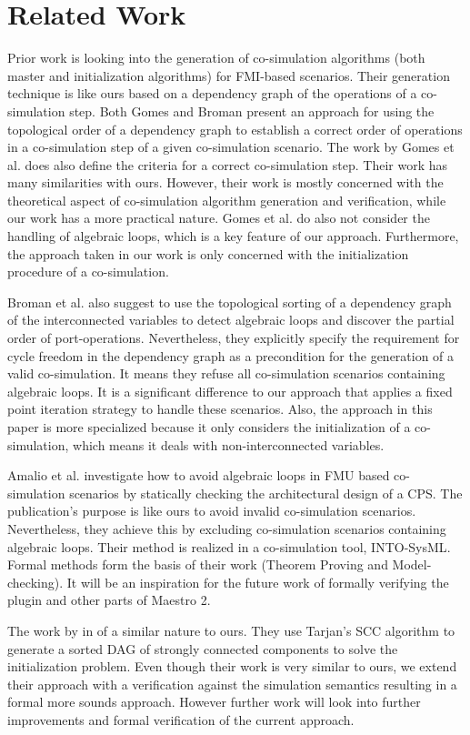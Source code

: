 \section{Related Work}
Prior work \cite{Gomes2019, BromanCompositionCo-Simulation} is looking into the generation of co-simulation algorithms (both master and initialization algorithms) for FMI-based scenarios. Their generation technique is like ours based on a dependency graph of the operations of a co-simulation step. Both Gomes and Broman present an approach for using the topological order of a dependency graph to establish a correct order of operations in a co-simulation step of a given co-simulation scenario.
The work by Gomes et al. \cite{Gomes2019} does also define the criteria for a correct co-simulation step. Their work has many similarities with ours. However, their work is mostly concerned with the theoretical aspect of co-simulation algorithm generation and verification, while our work has a more practical nature. Gomes et al. do also not consider the handling of algebraic loops, which is a key feature of our approach. Furthermore, the approach taken in our work is only concerned with the initialization procedure of a co-simulation.

Broman et al. \cite{BromanCompositionCo-Simulation} also suggest to use the topological sorting of a dependency graph of the interconnected variables to detect algebraic loops and discover the partial order of port-operations. Nevertheless, they explicitly specify the requirement for cycle freedom in the dependency graph as a precondition for the generation of a valid co-simulation. It means they refuse all co-simulation scenarios containing algebraic loops. It is a significant difference to our approach that applies a fixed point iteration strategy to handle these scenarios. Also, the approach in this paper is more specialized because it only considers the initialization of a co-simulation, which means it deals with non-interconnected variables.

Amalio et al. \cite{Amalio2016CheckingCo-simulation} investigate how to avoid algebraic loops in FMU based co-simulation scenarios by statically checking the architectural design of a CPS. The publication's purpose is like ours to avoid invalid co-simulation scenarios. Nevertheless, they achieve this by excluding co-simulation scenarios containing algebraic loops. Their method is realized in a co-simulation tool, INTO-SysML\cite{Miyazawa2016INtegratedModelling}. Formal methods form the basis of their work (Theorem Proving and Model-checking). It will be an inspiration for the future work of formally verifying the plugin and other parts of Maestro 2. 

The work by \cite{EvoraGomez2019a} in of a similar nature to ours. They use Tarjan’s SCC algorithm to generate a sorted DAG of strongly connected components to solve the initialization problem.
Even though their work is very similar to ours, we extend their approach with a verification against the simulation semantics resulting in a formal more sounds approach. However further work will look into further improvements and formal verification of the current approach.